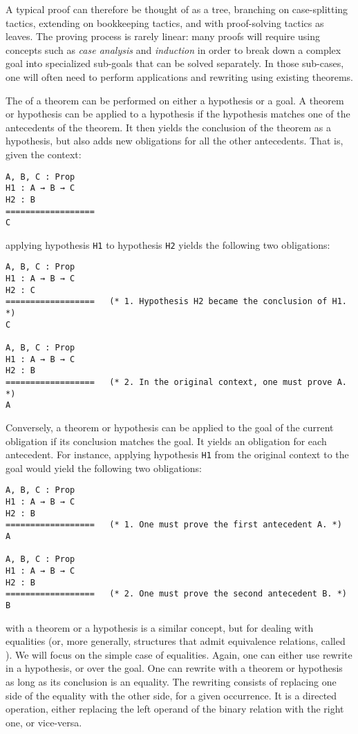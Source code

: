A typical proof can therefore be thought of as a tree, branching on
case-splitting tactics, extending on bookkeeping tactics, and with proof-solving
tactics as leaves.  The proving process is rarely linear: many proofs will
require using concepts such as \emph{case analysis} and \emph{induction} in
order to break down a complex goal into specialized sub-goals that can be solved
separately.  In those sub-cases, one will often need to perform applications and
rewriting using existing theorems.

The  of a theorem can be performed on either a hypothesis or
a goal.  A theorem or hypothesis can be applied to a hypothesis if the
hypothesis matches one of the antecedents of the theorem.  It then yields the
conclusion of the theorem as a hypothesis, but also adds new obligations for all
the other antecedents. That is, given the context:

\begin{verbatim}
A, B, C : Prop
H1 : A → B → C
H2 : B
==================
C
\end{verbatim}

applying hypothesis \texttt{H1} to hypothesis \texttt{H2}
yields the following two obligations:

\begin{verbatim}
A, B, C : Prop
H1 : A → B → C
H2 : C
==================   (* 1. Hypothesis H2 became the conclusion of H1. *)
C

A, B, C : Prop
H1 : A → B → C
H2 : B
==================   (* 2. In the original context, one must prove A. *)
A
\end{verbatim}

Conversely, a theorem or hypothesis can be applied to the goal of the current
obligation if its conclusion matches the goal.  It yields an obligation for each
antecedent.  For instance, applying hypothesis \texttt{H1} from the
original context to the goal would yield the following two obligations:

\begin{verbatim}
A, B, C : Prop
H1 : A → B → C
H2 : B
==================   (* 1. One must prove the first antecedent A. *)
A

A, B, C : Prop
H1 : A → B → C
H2 : B
==================   (* 2. One must prove the second antecedent B. *)
B
\end{verbatim}

 with a theorem or a hypothesis is a similar concept, but for
dealing with equalities (or, more generally, structures that admit equivalence
relations, called ).  We will focus on the simple case of
equalities.  Again, one can either use rewrite in a hypothesis, or over the
goal.  One can rewrite with a theorem or hypothesis as long as its conclusion is
an equality.  The rewriting consists of replacing one side of the equality with
the other side, for a given occurrence.  It is a directed operation, either
replacing the left operand of the binary relation with the right one, or
vice-versa.

